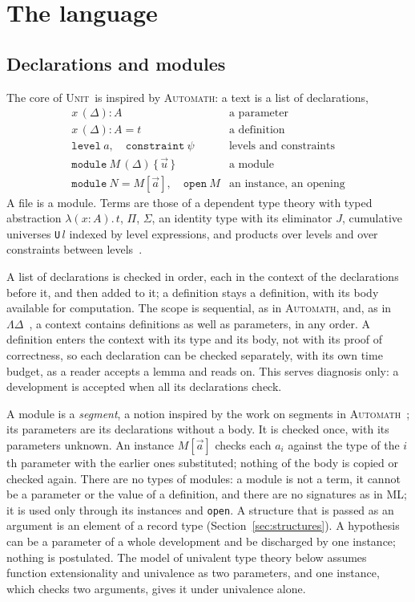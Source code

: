 \documentclass[11pt]{article}
\newcommand{\sys}{\textsc{Unit}}
\newcommand{\kw}[1]{\texttt{#1}}
\begin{document}
\section{The language}\label{sec:checker}

\subsection{Declarations and modules}

The core of \sys\ is inspired by \textsc{Automath}: a text is a list of
declarations,
\[
\begin{array}{ll}
x\,(\Delta) : A & \text{a parameter}\\
x\,(\Delta) : A = t & \text{a definition}\\
\kw{level}\ a,\quad \kw{constraint}\ \psi & \text{levels and constraints}\\
\kw{module}\ M\,(\Delta)\,\{\,\vec u\,\} & \text{a module}\\
\kw{module}\ N = M[\vec a],\quad \kw{open}\ M & \text{an instance, an opening}
\end{array}
\]
A file is a module. Terms are those of a dependent type theory with
typed abstraction $\lambda(x:A).\,t$, $\Pi$, $\Sigma$, an identity type
with its eliminator $J$, cumulative universes \kw{U}\,$l$ indexed by
level expressions, and products over levels and over constraints
between levels~\cite{BCDE}.

A list of declarations is checked in order, each in the context of the
declarations before it, and then added to it; a definition stays a
definition, with its body available for computation. The scope is
sequential, as in \textsc{Automath}, and, as in
$\Lambda\Delta$~\cite{LD}, a context contains definitions as well as
parameters, in any order. A definition enters the context with its type
and its body, not with its proof of correctness, so each declaration can
be checked separately, with its own time budget, as a reader accepts a
lemma and reads on. This serves diagnosis only: a development is
accepted when all its declarations check.

A module is a \emph{segment}, a notion inspired by the work on
segments in \textsc{Automath}~\cite{Seg}; its
parameters are its declarations without a body. It is checked once,
with its parameters unknown. An instance $M[\vec a]$ checks each $a_i$
against the type of the $i$th parameter with the earlier ones
substituted; nothing of the body is copied or checked again. There are no
types of modules: a module is not a term, it cannot be a parameter or
the value of a definition, and there are no signatures as in ML; it is
used only through its instances and \kw{open}. A structure that is
passed as an argument is an element of a record type
(Section~\ref{sec:structures}). A
hypothesis can be a parameter of a whole development and be discharged
by one instance; nothing is postulated. The model of univalent type
theory below assumes function extensionality and univalence as two
parameters, and one instance, which checks two arguments, gives it under
univalence alone.
\end{document}
